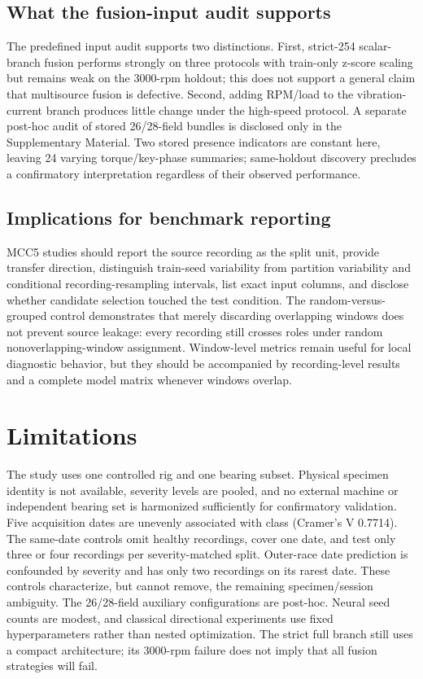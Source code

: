 \documentclass[machines,article,submit,oneauthor]{Definitions/mdpi}
\begin{document}
\subsection{What the fusion-input audit supports}
The predefined input audit supports two distinctions. First, strict-254 scalar-branch fusion performs strongly on three protocols with train-only z-score scaling but remains weak on the 3000-rpm holdout; this does not support a general claim that multisource fusion is defective. Second, adding RPM/load to the vibration-current branch produces little change under the high-speed protocol. A separate post-hoc audit of stored 26/28-field bundles is disclosed only in the Supplementary Material. Two stored presence indicators are constant here, leaving 24 varying torque/key-phase summaries; same-holdout discovery precludes a confirmatory interpretation regardless of their observed performance.

\subsection{Implications for benchmark reporting}
MCC5 studies should report the source recording as the split unit, provide transfer direction, distinguish train-seed variability from partition variability and conditional recording-resampling intervals, list exact input columns, and disclose whether candidate selection touched the test condition. The random-versus-grouped control demonstrates that merely discarding overlapping windows does not prevent source leakage: every recording still crosses roles under random nonoverlapping-window assignment. Window-level metrics remain useful for local diagnostic behavior, but they should be accompanied by recording-level results and a complete model matrix whenever windows overlap.

\section{Limitations}
The study uses one controlled rig and one bearing subset. Physical specimen identity is not available, severity levels are pooled, and no external machine or independent bearing set is harmonized sufficiently for confirmatory validation. Five acquisition dates are unevenly associated with class (Cramer's V 0.7714). The same-date controls omit healthy recordings, cover one date, and test only three or four recordings per severity-matched split. Outer-race date prediction is confounded by severity and has only two recordings on its rarest date. These controls characterize, but cannot remove, the remaining specimen/session ambiguity. The 26/28-field auxiliary configurations are post-hoc. Neural seed counts are modest, and classical directional experiments use fixed hyperparameters rather than nested optimization. The strict full branch still uses a compact architecture; its 3000-rpm failure does not imply that all fusion strategies will fail.
\end{document}
